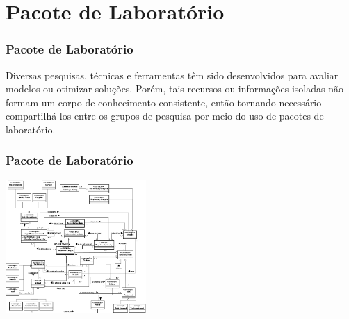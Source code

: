 \documentclass[aspectratio=169]{beamer}
\begin{document}
\section{Pacote de Laboratório}

\begin{frame}
\frametitle{Pacote de Laboratório}
\justifying

Diversas pesquisas, técnicas e ferramentas têm sido desenvolvidos para avaliar modelos ou otimizar soluções. Porém, tais recursos ou informações isoladas não formam um corpo de conhecimento consistente, então tornando necessário compartilhá-los entre os grupos de pesquisa por meio do uso de
pacotes de laboratório.

\end{frame}

\begin{frame}
\frametitle{Pacote de Laboratório}
\justifying

\begin{center}
\includegraphics[width=0.4\textwidth]{onto.png}
\end{center}

\end{frame}
\end{document}
